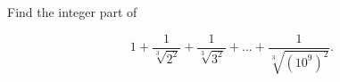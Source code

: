 Find the integer part of

\[
1 + \dfrac{1}{\sqrt[3]{2^2}} + \dfrac{1}{\sqrt[3]{3^2}} + \dots + \dfrac{1}{\sqrt[3]{(10^9)^2}}.
\]
